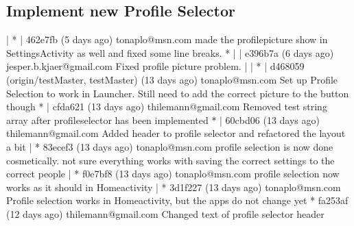 \subsection{Implement new Profile Selector}
| * | 462e7fb (5 days ago) tonaplo@msn.com made the profilepicture show in SettingsActivity as well and fixed some line breaks.
* | | e396b7a (6 days ago) jesper.b.kjaer@gmail.com Fixed profile picture problem.
| | * | d468059 (origin/testMaster, testMaster) (13 days ago) tonaplo@msn.com Set up Profile Selection to work in Launcher. Still need to add the correct picture to the button though
* | cfda621 (13 days ago) thilemann@gmail.com Removed test string array after profileselector has been implemented
* | 60cbd06 (13 days ago) thilemann@gmail.com Added header to profile selector and refactored the layout a bit
| * 83ecef3 (13 days ago) tonaplo@msn.com profile selection is now done cosmetically. not sure everything works with saving the correct settings to the correct people
| * f0e7bf8 (13 days ago) tonaplo@msn.com profile selection now works as it should in Homeactivity
| * 3d1f227 (13 days ago) tonaplo@msn.com Profile selection works in Homeactivity, but the apps do not change yet
* fa253af (12 days ago) thilemann@gmail.com Changed text of profile selector header